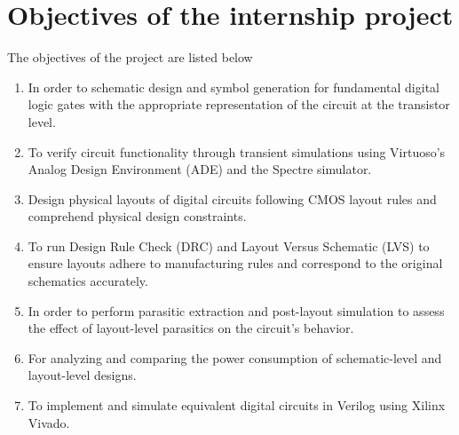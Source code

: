 \documentclass[12pt]{article}
\begin{document}
\section{Objectives of the internship project}
The objectives of the project are listed below
\begin{enumerate}
    \item In order to schematic design and symbol generation for fundamental digital logic gates with the appropriate representation of the circuit at the transistor level.

    \item To verify circuit functionality through transient simulations using Virtuoso’s Analog Design Environment (ADE) and the Spectre simulator.
    
    \item Design physical layouts of digital circuits following CMOS layout rules and comprehend physical design constraints.
    
    \item To run Design Rule Check (DRC) and Layout Versus Schematic (LVS) to ensure layouts adhere to manufacturing rules and correspond to the original schematics accurately.
    
    \item In order to perform parasitic extraction and post-layout simulation to assess the effect of layout-level parasitics on the circuit's behavior.

    \item For analyzing and comparing the power consumption of schematic-level and layout-level designs. 

    \item To implement and simulate equivalent digital circuits in Verilog using Xilinx Vivado.
    
\end{enumerate}
\end{document}
